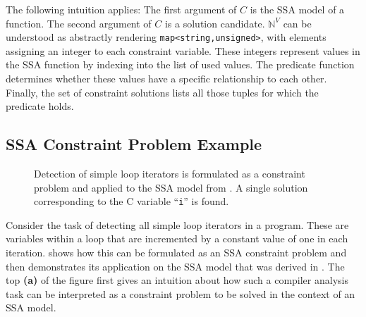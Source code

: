     The following intuition applies:
    The first argument of $C$ is the SSA model of a function.
    The second argument of $C$ is a solution candidate.
    $\mathbb N^V$ can be understood as abstractly rendering
    \lstinline[language=MyCpp]!map<string,unsigned>!, with elements assigning
    an integer to each constraint variable.
    These integers represent values in the SSA function by indexing into the
    list of used values.
    The predicate function determines whether these values have a specific
    relationship to each other.
    Finally, the set of constraint solutions lists all those tuples for which
    the predicate holds.

\subsection{SSA Constraint Problem Example}

\begin{figure}[p]
    
\caption{Detection of simple loop iterators is formulated as a constraint
         problem and applied to the SSA model from .
         A single solution corresponding to the C variable ``{\tt i}'' is found.}
\label{fig:constraintsolution}
\end{figure}

    Consider the task of detecting all simple loop iterators in a program.
    These are variables within a loop that are incremented by a constant value
    of one in each iteration.
     shows how this can be formulated as an
    SSA constraint problem and then demonstrates its application on the
    SSA model that was derived in .
    The top {\bf(a)} of the figure first gives an intuition about how such a
    compiler analysis task can be interpreted as a constraint problem to be
    solved in the context of an SSA model.

